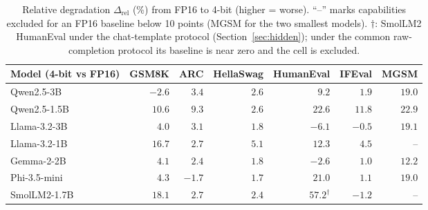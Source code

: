 \documentclass[11pt]{article}
\begin{document}
\begin{table}[t]
\centering
\small
\begin{tabular}{lrrrrrr}
\toprule
Model (4-bit vs FP16) & GSM8K & ARC & HellaSwag & HumanEval & IFEval & MGSM \\
\midrule
Qwen2.5-3B   & $-2.6$ & $3.4$  & $2.6$ & $9.2$   & $1.9$  & $19.0$ \\
Qwen2.5-1.5B & $10.6$ & $9.3$  & $2.6$ & $22.6$  & $11.8$ & $22.9$ \\
Llama-3.2-3B & $4.0$  & $3.1$  & $1.8$ & $-6.1$  & $-0.5$ & $19.1$ \\
Llama-3.2-1B & $16.7$ & $2.7$  & $5.1$ & $12.3$  & $4.5$  & --     \\
Gemma-2-2B   & $4.1$  & $2.4$  & $1.8$ & $-2.6$  & $1.0$  & $12.2$ \\
Phi-3.5-mini & $4.3$  & $-1.7$ & $1.7$ & $21.0$  & $1.1$  & $19.0$ \\
SmolLM2-1.7B & $18.1$ & $2.7$  & $2.4$ & $57.2^{\dagger}$ & $-1.2$ & --   \\
\bottomrule
\end{tabular}
\caption{Relative degradation $\Delta_{\text{rel}}$ (\%) from FP16 to 4-bit
(higher = worse). ``--'' marks capabilities excluded for an FP16 baseline below
10 points (MGSM for the two smallest models). $\dagger$: SmolLM2 HumanEval under
the chat-template protocol (Section~\ref{sec:hidden}); under the common
raw-completion protocol its baseline is near zero and the cell is excluded.}
\label{tab:degradation}
\end{table}
\end{document}
